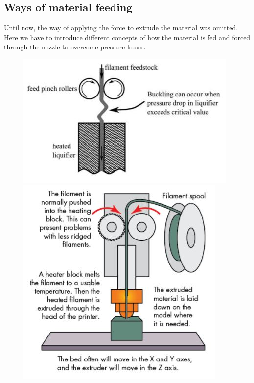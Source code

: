 \documentclass[a4paper, twoside, 11pt]{report}
\begin{document}
\subsection{Ways of material feeding}
Until now, the way of applying the force to extrude the material was omitted. Here we have to introduce different concepts of how the material is fed and forced through the nozzle to overcome pressure losses.
\begin{figure}[h]
  \centering
  \begin{minipage}[b]{0.45\textwidth}
    \includegraphics[width=\textwidth]{filamentBucklingReview}
  \end{minipage}
  \hfill
  \begin{minipage}[b]{0.45\textwidth}
    \includegraphics[width=\textwidth]{PinchRollerMachineDesign}

\end{minipage}
\end{figure}
\end{document}
